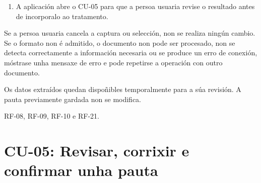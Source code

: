 \begin{description}
\begin{enumerate}
    \item A aplicación abre o CU-05 para que a persoa usuaria revise o resultado
    antes de incorporalo ao tratamento.
\end{enumerate}

\item[Fluxos alternativos:] Se a persoa usuaria cancela a captura ou selección,
non se realiza ningún cambio. Se o formato non é admitido, o documento non pode
ser procesado, non se detecta correctamente a información necesaria ou se
produce un erro de conexión, móstrase unha mensaxe de erro e pode repetirse a
operación con outro documento.

\item[Postcondicións:] Os datos extraídos quedan dispoñibles temporalmente para
a súa revisión. A pauta previamente gardada non se modifica.

\item[Requisitos relacionados:] RF-08, RF-09, RF-10 e RF-21.

\end{description}



\section{CU-05: Revisar, corrixir e confirmar unha pauta}
\label{cu:revisar-confirmar-pauta}

